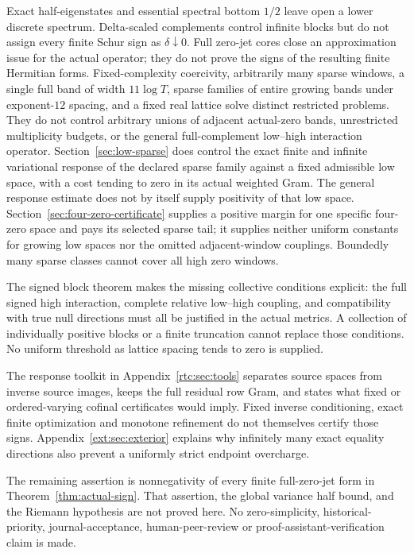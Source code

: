 \documentclass[11pt,a4paper]{article}
\numberwithin{equation}{section}
\theoremstyle{definition}\newtheorem{definition}[theorem]{Definition}
\theoremstyle{remark}\newtheorem{remark}[theorem]{Remark}
\begin{document}
Exact half-eigenstates and essential spectral bottom $1/2$ leave open a lower discrete spectrum. Delta-scaled complements control infinite blocks but do not assign every finite Schur sign as $\delta\downarrow0$. Full zero-jet cores close an approximation issue for the actual operator; they do not prove the signs of the resulting finite Hermitian forms. Fixed-complexity coercivity, arbitrarily many sparse windows, a single full band of width $11\log T$, sparse families of entire growing bands under exponent-$12$ spacing, and a fixed real lattice solve distinct restricted problems. They do not control arbitrary unions of adjacent actual-zero bands, unrestricted multiplicity budgets, or the general full-complement low--high interaction operator. Section~\ref{sec:low-sparse} does control the exact finite and infinite variational response of the declared sparse family against a fixed admissible low space, with a cost tending to zero in its actual weighted Gram. The general response estimate does not by itself supply positivity of that low space. Section~\ref{sec:four-zero-certificate} supplies a positive margin for one specific four-zero space and pays its selected sparse tail; it supplies neither uniform constants for growing low spaces nor the omitted adjacent-window couplings. Boundedly many sparse classes cannot cover all high zero windows.

The signed block theorem makes the missing collective conditions explicit: the full signed high interaction, complete relative low--high coupling, and compatibility with true null directions must all be justified in the actual metrics. A collection of individually positive blocks or a finite truncation cannot replace those conditions. No uniform threshold as lattice spacing tends to zero is supplied.

The response toolkit in Appendix~\ref{rtc:sec:tools} separates source spaces from inverse source images, keeps the full residual row Gram, and states what fixed or ordered-varying cofinal certificates would imply. Fixed inverse conditioning, exact finite optimization and monotone refinement do not themselves certify those signs. Appendix~\ref{ext:sec:exterior} explains why infinitely many exact equality directions also prevent a uniformly strict endpoint overcharge.

The remaining assertion is nonnegativity of every finite full-zero-jet form in Theorem~\ref{thm:actual-sign}. That assertion, the global variance half bound, and the Riemann hypothesis are not proved here. No zero-simplicity, historical-priority, journal-acceptance, human-peer-review or proof-assistant-verification claim is made.
\end{document}
